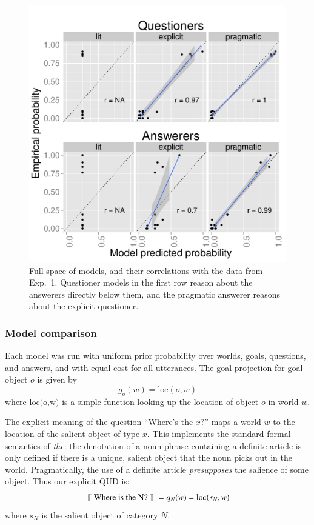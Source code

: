 \documentclass[12pt, floatsintext, jou]{apa6}
\newcommand{\den}[2][]{
\(
\left\llbracket\;\text{#2}\;\right\rrbracket^{#1}
\)
}
\begin{document}
\begin{figure}[t!]
\begin{center}
\includegraphics[scale=.75]{Exp3ModelFits.pdf}
\end{center}
\caption{Full space of models, and their correlations with the data from Exp.~1. Questioner models in the first row reason about the answerers directly below them, and the pragmatic answerer reasons about the explicit questioner.}
\label{fig:Exp3ModelSpace}
\end{figure}

\subsubsection{Model comparison}

Each model was run with uniform prior probability over worlds, goals, questions, and answers, and with equal cost for all utterances. The goal projection for goal object $o$ is given by $$g_o(w) = \textrm{loc}(o,w)$$ where $\textrm{loc(o,w)}$ is a simple function looking up the location of object $o$ in world $w$. 

The explicit meaning of the question ``Where's the $x$?'' maps a world $w$ to the location of the salient object of type $x$. This implements the standard formal semantics of \emph{the}: the denotation of a noun phrase containing a definite article is only defined if there is a unique, salient object that the noun picks out in the world. Pragmatically, the use of a definite article \emph{presupposes} the salience of some object. Thus our explicit QUD is: 
$$\textrm{\den{Where is the N?}} = q_{N}(w) = \textrm{loc}(s_N,w)$$ where $s_N$ is the salient object of category $N$. 
\end{document}
